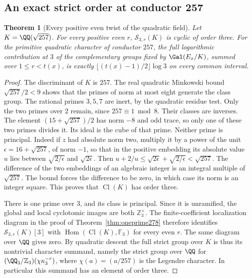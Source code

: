 \documentclass[a4paper,11pt]{article}
\newtheorem{theorem}[proposition]{Theorem}
\theoremstyle{definition}
\theoremstyle{remark}
\newcommand{\ZZ}{\mathbb Z}\newcommand{\ord}{\operatorname{ord}}
\numberwithin{equation}{section}
\newcommand{\Cl}{\operatorname{Cl}}
\begin{document}
\subsection{An exact strict order at conductor 257}\label{nav:II-58}
\begin{theorem}[Every positive even twist of the quadratic field]\leavevmode
\label{thm:quadratic278}
Let \(K=\QQ(\sqrt{257})\). For every positive even \(r\),
\(\mathcal S_{3,r}(K)\) is cyclic of order three.
For the primitive quadratic character of conductor \(257\),
the full logarithmic contribution at \(3\) of the complementary
groups fixed by \(\Gal(E_x/K)\), summed over \(1\le r<t(x)\),
is exactly \(\lfloor(t(x)-1)/2\rfloor\log3\) on every common interval.
\end{theorem}
\begin{proof}
The discriminant of \(K\) is \(257\). The real quadratic
Minkowski bound \(\sqrt{257}/2<9\) shows that the primes of
norm at most eight generate the class group. The rational primes
\(3,5,7\) are inert, by the quadratic residue test. Only the
two primes over \(2\) remain, since \(257\equiv1\bmod8\).
Their classes are inverses. The element
\((15+\sqrt{257})/2\) has norm \(-8\) and odd trace,
so only one of these two primes divides it. Its ideal is the
cube of that prime. Neither prime is principal. Indeed if \(z\)
had absolute norm two, multiply it by a power of the unit
\(\epsilon=16+\sqrt{257}\), of norm \(-1\), so that in the
positive embedding its absolute value \(u\) lies between
\(\sqrt{2/\epsilon}\) and \(\sqrt{2\epsilon}\).
Then \(u+2/u\le\sqrt{2\epsilon}+\sqrt{2/\epsilon}<\sqrt{257}\).
The difference of the two embeddings of an algebraic integer
is an integral multiple of \(\sqrt{257}\). The bound forces
the difference to be zero, in which case its norm is an integer
square. This proves that \(\Cl(K)\) has order three.

There is one prime over \(3\), and its class is principal.
Since it is unramified, the global and local cyclotomic
images are both \(\ZZ_3^\times\). The finite-coefficient
localization diagram in the proof of Theorem~\ref{thm:oneprime278}
therefore identifies \(\mathcal S_{3,r}(K)[3]\) with
\(\operatorname{Hom}(\Cl(K),\mathbb F_3)\) for every even \(r\).
The same diagram over \(\QQ\) gives zero. By quadratic descent
the full strict group over \(K\) is thus its nontrivial
character summand, namely the strict group over \(\QQ\) for
\((\QQ_3/\ZZ_3)(\chi\kappa_3^{-r})\), where
\(\chi(a)=(a/257)\) is the Legendre character. In particular
this summand has an element of order three.


\end{proof}
\end{document}

